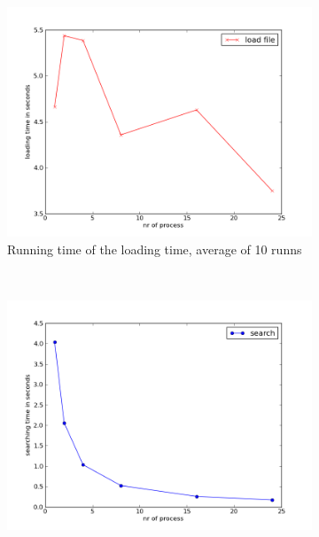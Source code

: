 \documentclass[a4paper,10pt]{article}
\begin{document}
\begin{figure}[h!]
        \centering
        \begin{subfigure}[b]{0.48\textwidth}
                \centering
                \includegraphics[width=\textwidth]{graphics/mpio_load_data.png}
                \caption{Running time of the loading time, average of 10 runns}
                \label{fig:gull}
        \end{subfigure}%
\\
        \begin{subfigure}[b]{0.48\textwidth}
                \centering
                \includegraphics[width=\textwidth]{graphics/mpio_searching_time.png}

\end{subfigure}
\end{figure}
\end{document}
